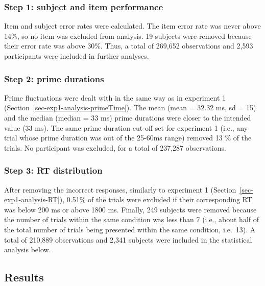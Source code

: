 \documentclass[
]{interact}
\begin{document}
\subsubsection{Step 1: subject and item
performance}\label{sec-exp2-analysis-performance}

Item and subject error rates were calculated. The item error rate was
never above 14\%, so no item was excluded from analysis. 19 subjects
were removed because their error rate was above 30\%. Thus, a total of
269,652 observations and 2,593 participants were included in further
analyses.

\subsubsection{Step 2: prime
durations}\label{sec-exp2-analysis-primeTime}

Prime fluctuations were dealt with in the same way as in experiment 1
(Section~\ref{sec-exp1-analysis-primeTime}). The mean (mean = 32.32 ms,
sd = 15) and the median (median = 33 ms) prime durations were closer to
the intended value (33 ms). The same prime duration cut-off set for
experiment 1 (i.e., any trial whose prime duration was out of the
25-60ms range) removed 13 \% of the trials. No participant was excluded,
for a total of 237,287 observations.

\subsubsection{Step 3: RT distribution}\label{sec-exp2-analysis-RT}

After removing the incorrect responses, similarly to experiment 1
(Section~\ref{sec-exp1-analysis-RT}), 0.51\% of the trials were excluded
if their corresponding RT was below 200 ms or above 1800 ms. Finally,
249 subjects were removed because the number of trials within the same
condition was less than 7 (i.e., about half of the total number of
trials being presented within the same condition, i.e.~13). A total of
210,889 observations and 2,341 subjects were included in the statistical
analysis below.

\subsection{Results}\label{sec-exp2-results}
\end{document}
